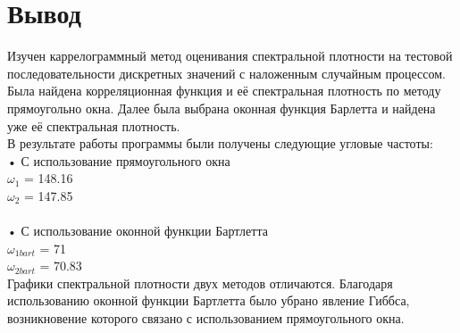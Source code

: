 \documentclass[12pt]{article}
\begin{document}
\begin{figure}[!htb]
\centering
\caption{}
\label{}
\end{figure}

\begin{figure}[!htb]
\centering
\caption{}
\label{}
\end{figure}

\begin{figure}[!htb]
\centering
\caption{}
\label{}
\end{figure}



\section{Вывод}
Изучен каррелограммный метод оценивания спектральной плотности на тестовой последовательности дискретных значений с наложенным случайным процессом. Была найдена корреляционная функция и её спектральная плотность по методу прямоугольно окна. Далее была выбрана оконная функция Барлетта и найдена уже её спектральная плотность.\\
В результате работы программы были получены следующие угловые частоты:\\
    • С использование прямоугольного окна\\
$\omega_{1}$ = 148.16\\
$\omega_{2}$ = 147.85\\
\\
    • С использование оконной функции Бартлетта\\
$\omega_{1bart}$ = 71\\
$\omega_{2bart}$ = 70.83\\

Графики спектральной плотности двух методов отличаются. Благодаря использованию оконной функции Бартлетта было убрано явление Гиббса, возникновение которого связано с использованием прямоугольного окна.
\end{document}
